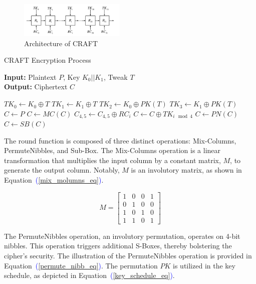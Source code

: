 \documentclass[final,5p,times,twocolumn]{elsarticle}
\begin{document}
\begin{figure}[h]%
    \centering
    \includegraphics[width=0.45\textwidth]{./fig/struct-craft.pdf}
    \caption{Architecture of CRAFT}\label{fig1}
\end{figure}

\begin{algorithm}[h]
    \caption{CRAFT Encryption Process}\label{alg1}
    \textbf{Input:} Plaintext $P$, Key $K_0||K_1$, Tweak $T$ \\
    \textbf{Output:} Ciphertext $C$
    \begin{algorithmic}[1]
        \State $TK_0 \gets K_0\oplus T$
        \State $TK_1 \gets K_1\oplus T$
        \State $TK_2 \gets K_0\oplus PK(T)$
        \State $TK_3 \gets K_1\oplus PK(T)$
        \State $C \gets P$
        \State $C \gets MC(C)$
        \State $C_{4,5} \gets C_{4,5}\oplus RC_i$
        \State $C \gets C \oplus TK_{i\mod 4}$
        \State $C \gets PN(C)$
        \State $C \gets SB(C)$
        \EndIf
        \EndFor
    \end{algorithmic}
\end{algorithm}

The round function is composed of three distinct operations: Mix-Columns, PermuteNibbles, and Sub-Box.
The Mix-Columns operation is a linear transformation that multiplies the input column by a constant matrix, $M$, to generate the output column. Notably, $M$ is an involutory matrix, as shown in Equation~\textcolor{blue}{(\ref{mix_molumns_eq})}.


\begin{equation}
    M =
    \begin{bmatrix}
        1 & 0 & 0 & 1 \\
        0 & 1 & 0 & 0 \\
        1 & 0 & 1 & 0 \\
        1 & 1 & 0 & 1
    \end{bmatrix}
    \label{mix_molumns_eq}
\end{equation}

The PermuteNibbles operation, an involutory permutation, operates on 4-bit nibbles. This operation triggers additional S-Boxes, thereby bolstering the cipher's security. The illustration of the PermuteNibbles operation is provided in Equation~\textcolor{blue}{(\ref{permute_nibb_eq})}. The permutation $PK$ is utilized in the key schedule, as depicted in Equation~\textcolor{blue}{(\ref{key_schedule_eq})}.
\end{document}
